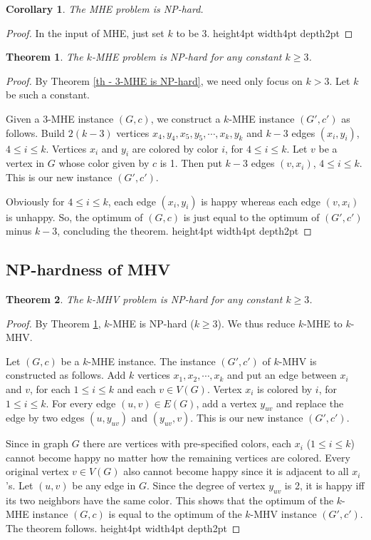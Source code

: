 \documentclass[11pt]{article}
\newtheorem{theorem}{Theorem}[section]
\newtheorem{corollary}{Corollary}[section]
\newcommand{\qed}{\vrule height4pt width4pt depth2pt}
\begin{document}
\begin{corollary}
The MHE problem is NP-hard.
\end{corollary}
\begin{proof}
In the input of MHE, just set $k$ to be 3. \qed
\end{proof}



\begin{theorem}
\label{th - k-MHE is NP-hard}
The $k$-MHE problem is NP-hard for any constant $k \geq 3$.
\end{theorem}
\begin{proof}
By Theorem \ref{th - 3-MHE is NP-hard}, we need only focus on $k > 3$.
Let $k$ be such a constant.

Given a 3-MHE instance $(G, c)$, we construct a $k$-MHE instance $(G', c')$
as follows. Build $2(k-3)$ vertices $x_4, y_4, x_5, y_5, \cdots, x_k, y_k$
and $k-3$ edges $(x_i, y_i)$, $4 \leq i \leq k$.
Vertices $x_i$ and $y_i$ are colored by color $i$, for $4 \leq i \leq k$.
Let $v$ be a vertex in $G$ whose color given by $c$ is 1.
Then put $k-3$ edges $(v, x_i)$, $4 \leq i \leq k$.
This is our new instance $(G', c')$.

Obviously for $4 \leq i \leq k$, each edge $(x_i, y_i)$ is happy
whereas each edge $(v, x_i)$ is unhappy.
So, the optimum of $(G, c)$ is just equal to the optimum of $(G', c')$
minus $k-3$, concluding the theorem.
\qed
\end{proof}




\subsection{NP-hardness of MHV}
\label{subsec - NP-hardness of MHV}
\begin{theorem}
The $k$-MHV problem is NP-hard for any constant $k \geq 3$.
\end{theorem}
\begin{proof}
By Theorem \ref{th - k-MHE is NP-hard}, $k$-MHE is NP-hard ($k \geq 3$).
We thus reduce $k$-MHE to $k$-MHV.

Let $(G, c)$ be a $k$-MHE instance. The instance $(G', c')$ of $k$-MHV
is constructed as follows.
Add $k$ vertices $x_1, x_2, \cdots, x_k$ and put an edge between $x_i$
and $v$, for each $1 \leq i \leq k$ and each $v \in V(G)$.
Vertex $x_i$ is colored by $i$, for $1 \leq i \leq k$.
For every edge $(u, v) \in E(G)$, add a vertex $y_{uv}$ and replace the edge
by two edges $(u, y_{uv})$ and $(y_{uv}, v)$.
This is our new instance $(G', c')$.

Since in graph $G$ there are vertices with pre-specified colors,
each $x_i$ ($1 \leq i \leq k$) cannot become happy no matter how the remaining
vertices are colored. Every original vertex $v \in V(G)$ also cannot become happy
since it is adjacent to all $x_i$'s.
Let $(u, v)$ be any edge in $G$. Since the degree of vertex $y_{uv}$ is 2,
it is happy iff its two neighbors have the same color.
This shows that the optimum of the $k$-MHE instance $(G, c)$ is equal to
the optimum of the $k$-MHV instance $(G', c')$.
The theorem follows.
\qed
\end{proof}
\end{document}
